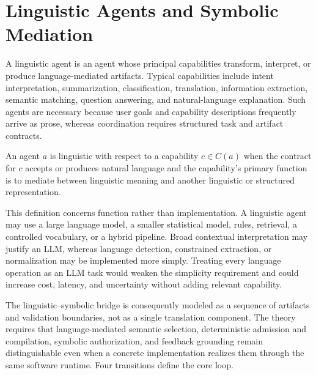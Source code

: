\section{Linguistic Agents and Symbolic Mediation}

A linguistic agent is an agent whose principal capabilities transform, interpret, or produce language-mediated artifacts. Typical capabilities include intent interpretation, summarization, classification, translation, information extraction, semantic matching, question answering, and natural-language explanation. Such agents are necessary because user goals and capability descriptions frequently arrive as prose, whereas coordination requires structured task and artifact contracts.

\begin{definition}
\label{def:linguistic-agent}
An agent $a$ is linguistic with respect to a capability $c \in C(a)$ when the contract for $c$ accepts or produces natural language and the capability's primary function is to mediate between linguistic meaning and another linguistic or structured representation.
\end{definition}

This definition concerns function rather than implementation. A linguistic agent may use a large language model, a smaller statistical model, rules, retrieval, a controlled vocabulary, or a hybrid pipeline. Broad contextual interpretation may justify an LLM, whereas language detection, constrained extraction, or normalization may be implemented more simply. Treating every language operation as an LLM task would weaken the simplicity requirement and could increase cost, latency, and uncertainty without adding relevant capability.

The linguistic--symbolic bridge is consequently modeled as a sequence of artifacts and validation boundaries, not as a single translation component. The theory requires that language-mediated semantic selection, deterministic admission and compilation, symbolic authorization, and feedback grounding remain distinguishable even when a concrete implementation realizes them through the same software runtime. Four transitions define the core loop.

